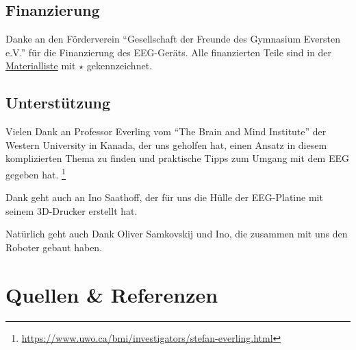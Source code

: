 \documentclass{scrartcl}
\begin{document}
	\subsection{Finanzierung} \label{Foerderverein}

	Danke an den Förderverein \enquote{Gesellschaft der Freunde des Gymnasium Eversten e.V.} für die Finanzierung des EEG-Geräts. Alle finanzierten Teile sind in der \hyperref[Materialien]{Materialliste} mit $\star$ gekennzeichnet. 

	\subsection{Unterstützung}

	Vielen Dank an Professor Everling vom \enquote{The Brain and Mind Institute} der Western University in Kanada, der uns geholfen hat, einen Ansatz in diesem komplizierten Thema zu finden und praktische Tipps zum Umgang mit dem EEG gegeben hat. \footnote{\href{https://www.uwo.ca/bmi/investigators/stefan-everling.html}{https://www.uwo.ca/bmi/investigators/stefan-everling.html}}

	Dank geht auch an Ino Saathoff, der für uns die Hülle der EEG-Platine mit seinem 3D-Drucker erstellt hat.

	Natürlich geht auch Dank Oliver Samkovskij und Ino, die zusammen mit uns den Roboter gebaut haben.

	\section{Quellen \& Referenzen}

	\printbibliography[title={Literatur}, keyword={Literatur}, notkeyword={YTVideos}]

	\printbibliography[title={Videos}, keyword={YTVideos}]

	\printbibliography[title=Programme, keyword=Programme]
\end{document}

